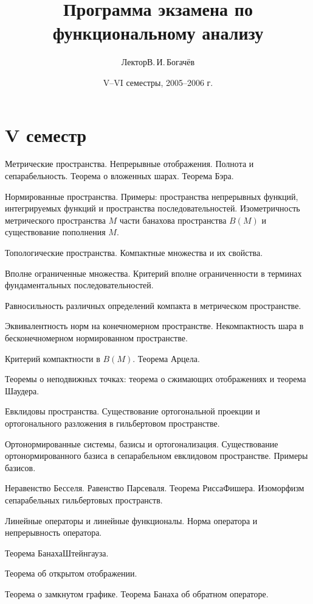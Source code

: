 \documentclass[a4paper]{article}
\title{Программа экзамена по функциональному анализу}
\author{Лектор\т В.\,И.\,Богачёв}
\date{V--VI семестры, 2005--2006 г.}
\begin{document}
\maketitle

\section*{V семестр}

\begin{nums}{-2}
\item Метрические пространства. Непрерывные отображения. Полнота и сепарабельность. Теорема о вложенных шарах. Теорема Бэра.
\item Нормированные пространства. Примеры: пространства непрерывных функций, интегрируемых функций и пространства
      последовательностей. Изометричность метрического пространства $M$ части банахова пространства $B(M)$ и существование пополнения $M$.
\item Топологические пространства. Компактные множества и их свойства.
\item Вполне ограниченные множества. Критерий вполне ограниченности в терминах фундаментальных последовательностей.
\item Равносильность различных определений компакта в метрическом пространстве.
\item Эквивалентность норм на конечномерном пространстве. Некомпактность шара в бесконечномерном нормированном пространстве.
\item Критерий компактности в $B(M)$. Теорема Арцела.
\item Теоремы о неподвижных точках: теорема о сжимающих отображениях и теорема Шаудера.
\item Евклидовы пространства. Существование ортогональной проекции и ортогонального разложения в гильбертовом пространстве.
\item Ортонормированные системы, базисы и ортогонализация. Существование ортонормированного базиса в сепарабельном евклидовом
      пространстве. Примеры базисов.
\item Неравенство Бесселя. Равенство Парсеваля. Теорема Рисса\ч Фишера. Изоморфизм сепарабельных гильбертовых пространств.
\item Линейные операторы и линейные функционалы. Норма оператора и непрерывность оператора.
\item Теорема Банаха\ч Штейнгауза.
\item Теорема об открытом отображении.
\item Теорема о замкнутом графике. Теорема Банаха об обратном операторе.

\end{nums}
\end{document}

